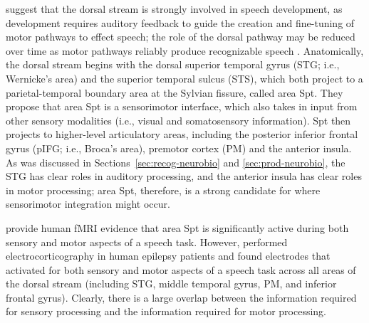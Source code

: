 \citet{hickok2007}
suggest that the dorsal stream
is strongly involved in
speech development,
as development requires auditory feedback
to guide the creation and fine-tuning
of motor pathways to effect speech;
the role of the dorsal pathway may
be reduced over time as motor pathways
reliably produce recognizable speech
\citep{schmidt1975,doyon2003}.
Anatomically, the dorsal stream begins with
the dorsal superior temporal gyrus (STG; i.e., Wernicke's area)
and the superior temporal sulcus (STS),
which both project to
a parietal-temporal boundary area at the Sylvian fissure,
called area Spt.
They propose that area Spt is a sensorimotor interface,
which also takes in input from other sensory modalities
(i.e., visual and somatosensory information).
Spt then projects to higher-level articulatory areas,
including the posterior inferior frontal gyrus (pIFG; i.e., Broca's area),
premotor cortex (PM) and the anterior insula.
As was discussed in
Sections~\ref{sec:recog-neurobio}
and \ref{sec:prod-neurobio},
the STG has clear roles in auditory processing,
and the anterior insula has clear roles in
motor processing;
area Spt, therefore, is a strong candidate
for where sensorimotor integration might occur.

\citet{hickok2009}
provide human fMRI evidence that
area Spt is significantly active
during both sensory and motor aspects
of a speech task.
However, \citet{cogan2014}
performed electrocorticography
in human epilepsy patients
and found electrodes that activated
for both sensory and motor aspects
of a speech task across all areas
of the dorsal stream
(including STG, middle temporal gyrus, PM,
and inferior frontal gyrus).
Clearly, there is a large overlap
between the information required for
sensory processing and the information required
for motor processing.

